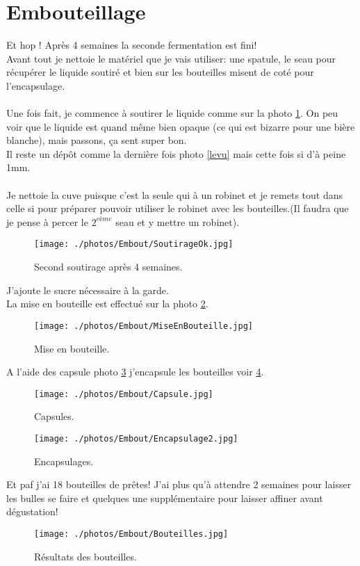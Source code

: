 \documentclass[twoside,twocolumn]{report}
\begin{document}
		\section{Embouteillage }
		Et hop ! Après 4 semaines la seconde fermentation est fini! \\
		Avant tout je nettoie le matériel que je vais utiliser: une spatule, le seau pour récupérer le liquide soutiré et bien sur les bouteilles misent de coté pour l'encapsulage.\\
		\\
		Une fois fait, je commence à soutirer le liquide comme sur la photo \ref{secondsou}. On peu voir que le liquide est quand même bien opaque (ce qui est bizarre pour une bière blanche), mais passons, ça sent super bon.\\
		Il reste un dépôt comme la dernière fois photo \ref{levu} mais cette fois si d'à peine 1mm.\\ \\
		Je nettoie la cuve puisque c'est la seule qui à un robinet et je remets 
		tout dans celle si pour préparer pouvoir utiliser le robinet avec les bouteilles.(Il faudra que je pense à percer le $\text{2}^{eème}$ seau et y mettre un robinet).
		
		\begin{figure}[h!]
			\centering
			\texttt{[image: ./photos/Embout/SoutirageOk.jpg]}
			\caption{Second soutirage après 4 semaines.}
			\label{secondsou}
		\end{figure}
		J'ajoute le sucre nécessaire à la garde.\\
		La mise en bouteille est effectué sur la photo \ref{Bout}.
		\begin{figure}[h!]
			\centering
			\texttt{[image: ./photos/Embout/MiseEnBouteille.jpg]}
			\caption{Mise en bouteille.}
			\label{Bout}
		\end{figure}
		A l'aide des capsule photo \ref{cap} j'encapsule les bouteilles voir \ref{Encap}.
		\begin{figure}[h!]
			\centering
			\texttt{[image: ./photos/Embout/Capsule.jpg]}
			\caption{Capsules.}
			\label{cap}
		\end{figure}
	 	\begin{figure}[h!]
	 		\centering
	 		\texttt{[image: ./photos/Embout/Encapsulage2.jpg]}
	 		\caption{Encapsulages.}
	 		\label{Encap}
	 	\end{figure}
	 	Et paf j'ai 18 bouteilles de prêtes! J'ai plus qu'à attendre 2 semaines pour laisser les bulles se faire et quelques une supplémentaire pour laisser affiner avant dégustation! 
	 	\begin{figure}[h!]
	 		\centering
	 		\texttt{[image: ./photos/Embout/Bouteilles.jpg]}
	 		\caption{Résultats des bouteilles.}
	 		\label{Embouteillage}
	 	\end{figure}
	 	
		 	
				 
	
		
				
				
				
			

			
				
						
		
 

	
\end{document}
